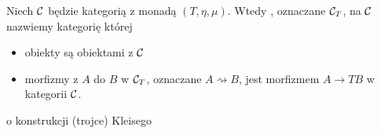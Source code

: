 \begin{definition}{}{}
  Niech $\mathcal{C}$ będzie kategorią z monadą $(T, \eta, \mu)$. Wtedy , oznaczane $\mathcal{C}_T$, na $\mathcal{C}$ nazwiemy kategorię której
  \begin{itemize}
    \item obiekty są obiektami z $\mathcal{C}$ 
    \item morfizmy z $A$ do $B$ w $\mathcal{C}_T$, oznaczane $A\rightsquigarrow B$, jest morfizmem $A\to TB$ w kategorii $\mathcal{C}$.
  \end{itemize}
\end{definition}

o konstrukcji (trojce) Kleisego





